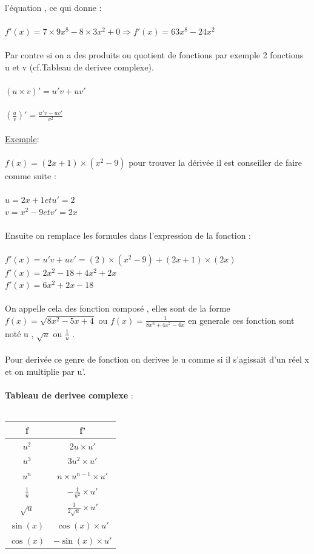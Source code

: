 \documentclass[a4paper,8pt,openany]{book}
\begin{document}
l'équation , ce qui donne :\\
\\
$f'(x)= 7\times9x^8-8\times3x^2+0 \Rightarrow f'(x)=63x^8-24x^2$\\
\\
Par contre si on a des produits ou quotient de fonctions par exemple 2 fonctions u et v (cf.Tableau de derivee complexe).\\
\\
$(u\times v)'=u'v+uv'$\\
\\
$\left(\frac{u}{v}\right)'=\frac{u'v-uv'}{v^2}$\\
\\
\underline{Exemple}:\\
\\
$f(x)=(2x+1)\times(x^2-9)$ pour trouver la dérivée il est conseiller de faire comme suite : \\
\\
$u = 2x +1 et u'=2$  \\
$v = x^2-9 et v'=2x$ \\
\\
Ensuite on remplace les formules dans l'expression de la fonction : \\
\\
$f'(x)=u'v+uv'=(2)\times(x^2-9)+(2x+1)\times(2x)$\\
$f'(x)=2x^2-18+4x^2+2x$\\
$f'(x)=6x^2+2x-18$\\
\\
On appelle cela des fonction composé , elles sont de la forme $f(x)=\sqrt{8x^2-5x+4}$ ou $f(x)=\frac{1}{8x^6+4x^7-6x}$ en generale ces fonction sont noté u , $\sqrt{u}$ ou $\frac{1}{u}$ .\\
\\
Pour derivée ce genre de fonction on derivee le u comme si il s'agissait d'un réel x et on multiplie par u'.\\
\\
\textbf{Tableau de derivee complexe} :\\
\\
\begin{center}
  \begin{tabular}{|c|c|}
    \hline
    f & f' \\ \hline
    $u^2$ & $2u\times u'$ \\ \hline
    $u^3$ & $3u^2\times u'$ \\ \hline
    $u^n$ & $n\times u^{n-1}\times u'$\\ \hline
    $\frac{1}{u}$ & $-\frac{1}{u^2} \times u'$ \\ \hline
    $\sqrt{u}$ & $\frac{1}{2\sqrt{u}}\times u'$ \\ \hline
    $\sin(x)$ & $\cos(x)\times u'$ \\  \hline
    $\cos(x)$ & $-\sin(x)\times u'$ \\
    \hline
  \end{tabular}
\end{center}\\
\end{document}
